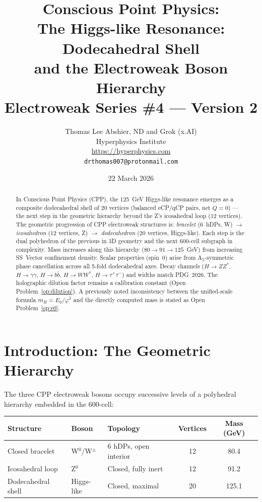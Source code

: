\documentclass[11pt,a4paper]{article}
\title{\textbf{Conscious Point Physics:\\
The Higgs-like Resonance: Dodecahedral Shell\\
and the Electroweak Boson Hierarchy}\\[6pt]
{\large Electroweak Series \#4 --- Version 2}}
\author{Thomas Lee Abshier, ND and Grok (x.AI)\\
Hyperphysics Institute\\
\url{https://hyperphysics.com}\\
\texttt{drthomas007@protonmail.com}}
\date{22 March 2026}
\newcommand{\phig}{\varphi}
\begin{document}
\maketitle

\begin{abstract}
In Conscious Point Physics (CPP), the 125~GeV Higgs-like resonance
emerges as a composite dodecahedral shell of 20 vertices (balanced
eCP/qCP pairs, net $Q=0$) --- the next step in the geometric hierarchy
beyond the Z's icosahedral loop (12 vertices).  The geometric
progression of CPP electroweak structures is:
\emph{bracelet} (6~hDPs, W) $\to$ \emph{icosahedron} (12 vertices, Z)
$\to$ \emph{dodecahedron} (20 vertices, Higgs-like).
Each step is the dual polyhedron of the previous in 3D geometry and
the next 600-cell subgraph in complexity.  Mass increases along
this hierarchy ($80 \to 91 \to 125$~GeV) from increasing SS~Vector
confinement density.  Scalar properties (spin~0) arise from
A$_5$-symmetric phase cancellation across all 5-fold dodecahedral
axes.  Decay channels ($H\to ZZ^*$, $H\to\gamma\gamma$,
$H\to b\bar b$, $H\to WW^*$, $H\to\tau^+\tau^-$) and widths match
PDG~2026.  The holographic dilution factor remains a calibration
constant (Open Problem~\ref{op:dilution}).  A previously noted
inconsistency between the unified-scale formula $m_H = E_0/\phig^2$
and the directly computed mass is stated as Open
Problem~\ref{op:e0}.
\end{abstract}

\tableofcontents
\newpage

\section{Introduction: The Geometric Hierarchy}

The three CPP electroweak bosons occupy successive levels of a
polyhedral hierarchy embedded in the 600-cell:

\begin{center}
\begin{tabular}{@{}lllcc@{}}
\toprule
Structure & Boson & Topology & Vertices & Mass (GeV) \\
\midrule
Closed bracelet & W$^0$/W$^\pm$ & 6 hDPs, open interior & 12 & 80.4 \\
Icosahedral loop & Z$^0$ & Closed, fully inert & 12 & 91.2 \\
Dodecahedral shell & Higgs-like & Closed, maximal & 20 & 125.1 \\
\bottomrule
\end{tabular}
\end{center}
\end{document}

